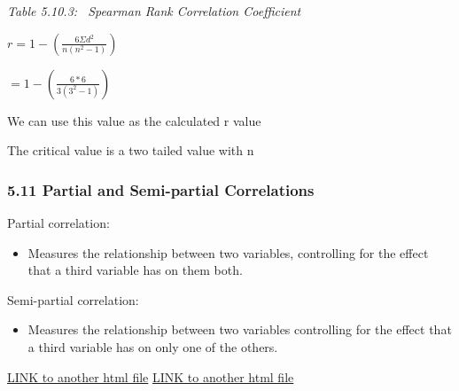 \documentclass[]{article}
\providecommand{\tightlist}{%
  \setlength{\itemsep}{0pt}\setlength{\parskip}{0pt}}
\begin{document}
\emph{Table 5.10.3: ~Spearman Rank Correlation Coefficient}

\(r=1-(\frac{6\Sigma d^2}{n(n^2 - 1)})\)

\(=1-(\frac{6*6}{3(3^2 - 1)})\)

We can use this value as the calculated r value

The critical value is a two tailed value with n

\hypertarget{partial-and-semi-partial-correlations}{%
\subsubsection{5.11 Partial and Semi-partial
Correlations}\label{partial-and-semi-partial-correlations}}

Partial correlation:

\begin{itemize}
\tightlist
\item
  Measures the relationship between two variables, controlling for the
  effect that a third variable has on them both.
\end{itemize}

Semi-partial correlation:

\begin{itemize}
\tightlist
\item
  Measures the relationship between two variables controlling for the
  effect that a third variable has on only one of the others.
\end{itemize}

\href{about.html}{LINK to another html file} \href{cv.html}{LINK to
another html file}
\end{document}
